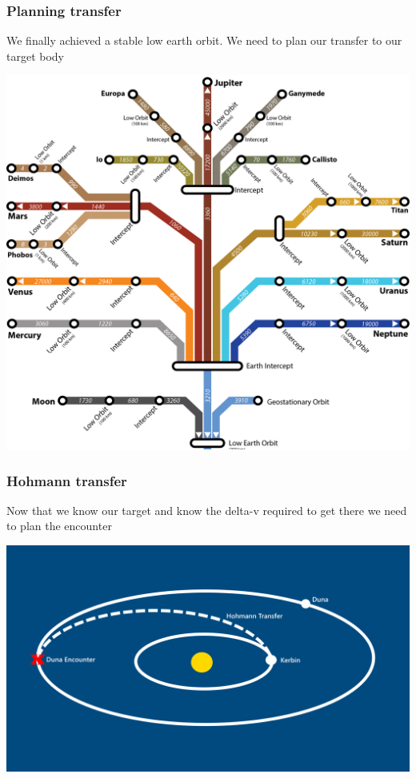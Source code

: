 \begin{frame}
    \frametitle{Planning transfer}
    \begin{block}{}
        We finally achieved a stable low earth orbit. We need to plan our transfer to our target body
    \end{block}
\end{frame}
\begin{frame}
    \begin{center}
        \includegraphics[height=\textheight]{images/deltavmap.png}
    \end{center}
\end{frame}
\begin{frame}
    \frametitle{Hohmann transfer}
    \begin{block}{}
        Now that we know our target and know the delta-v required to get there we need to plan the encounter
    \end{block}
    \begin{block}{}
        \begin{center}
            \includegraphics[scale=0.2]{images/hohmann_transfer}
        \end{center}
    \end{block}
\end{frame}
